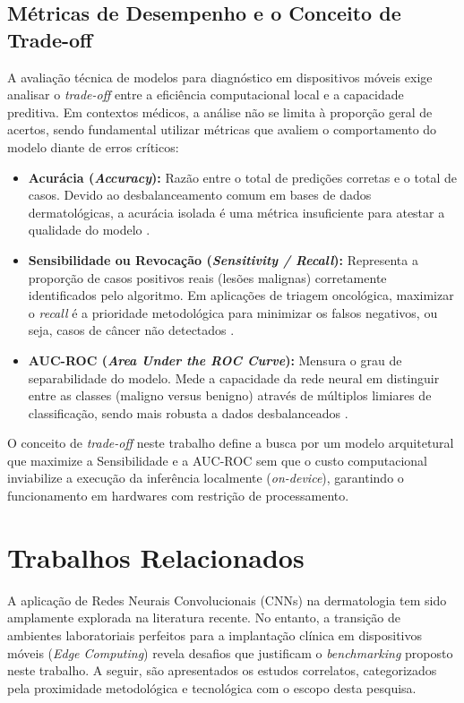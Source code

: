 \documentclass[oneside,english,brazilian]{UNISINOSmonografia}
\begin{document}
\section{Métricas de Desempenho e o Conceito de Trade-off}

A avaliação técnica de modelos para diagnóstico em dispositivos móveis exige analisar o \textit{trade-off} entre a eficiência computacional local e a capacidade preditiva. Em contextos médicos, a análise não se limita à proporção geral de acertos, sendo fundamental utilizar métricas que avaliem o comportamento do modelo diante de erros críticos:

\begin{itemize}
    \item \textbf{Acurácia (\textit{Accuracy}):} Razão entre o total de predições corretas e o total de casos. Devido ao desbalanceamento comum em bases de dados dermatológicas, a acurácia isolada é uma métrica insuficiente para atestar a qualidade do modelo \cite{sokolova2009systematic}.
    
    \item \textbf{Sensibilidade ou Revocação (\textit{Sensitivity / Recall}):} Representa a proporção de casos positivos reais (lesões malignas) corretamente identificados pelo algoritmo. Em aplicações de triagem oncológica, maximizar o \textit{recall} é a prioridade metodológica para minimizar os falsos negativos, ou seja, casos de câncer não detectados \cite{sokolova2009systematic}.
    
    \item \textbf{AUC-ROC (\textit{Area Under the ROC Curve}):} Mensura o grau de separabilidade do modelo. Mede a capacidade da rede neural em distinguir entre as classes (maligno versus benigno) através de múltiplos limiares de classificação, sendo mais robusta a dados desbalanceados \cite{fawcett2006introduction}.
      
\end{itemize}

O conceito de \textit{trade-off} neste trabalho define a busca por um modelo arquitetural que maximize a Sensibilidade e a AUC-ROC sem que o custo computacional inviabilize a execução da inferência localmente (\textit{on-device}), garantindo o funcionamento em hardwares com restrição de processamento.

\chapter{Trabalhos Relacionados}
A aplicação de Redes Neurais Convolucionais (CNNs) na dermatologia tem sido amplamente explorada na literatura recente. No entanto, a transição de ambientes laboratoriais perfeitos para a implantação clínica em dispositivos móveis (\textit{Edge Computing}) revela desafios que justificam o \textit{benchmarking} proposto neste trabalho. A seguir, são apresentados os estudos correlatos, categorizados pela proximidade metodológica e tecnológica com o escopo desta pesquisa.
\end{document}
